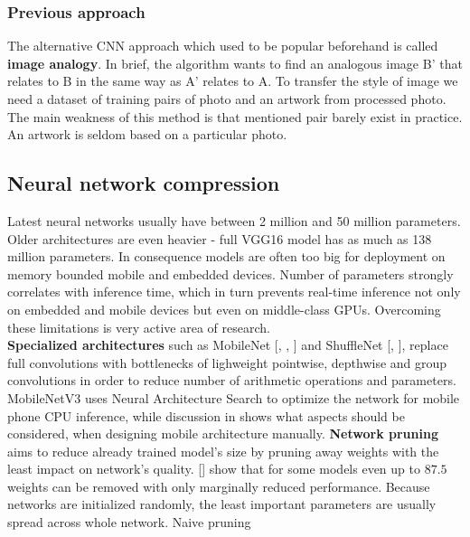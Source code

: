 \documentclass[../Main.tex]{subfiles}
\begin{document}
    \subsubsection{Previous approach}
    The alternative CNN approach which used to be popular beforehand is called \textbf{image analogy}. In brief, the algorithm wants to find an analogous image B' that relates to B in the same way as A' relates to A.  To transfer the style of image we need a dataset of training pairs of photo and an artwork from processed photo. The main weakness of this method is that mentioned pair barely exist in practice. An artwork is seldom based on a particular photo.


\subsection{Neural network compression}
    Latest neural networks usually have between 2 million and 50 million parameters.
    Older architectures are even heavier - full VGG16 model has as much as
    138 million parameters. In consequence models 
    are often too big for deployment on memory bounded mobile and embedded devices.
    Number of parameters strongly correlates with inference time, which in turn
    prevents real-time inference not only on embedded and mobile
    devices but even on middle-class GPUs. Overcoming these limitations 
    is very active area of research.\\
    \textbf{Specialized architectures} such as MobileNet [\cite{mobilenetv1},
    \cite{mobilenetv2}, \cite{mobilenetv3}] and ShuffleNet [\cite{shufflenetv1},
    \cite{shufflenetv2}], replace full convolutions with bottlenecks of lighweight
    pointwise, depthwise and group convolutions in order to reduce number of 
    arithmetic operations and parameters. MobileNetV3 \cite{mobilenetv3} uses
    Neural Architecture Search to optimize the network for mobile phone CPU
    inference, while discussion in \cite{shufflenetv2} shows what aspects should
    be considered, when designing mobile architecture manually. 
    \textbf{Network pruning} aims to reduce already trained model's size by pruning away
    weights with the least impact on network's quality. [\cite{zhu2017prune}] show
    that for some models even up to $87.5$ weights can be removed with only 
    marginally reduced performance. 
    Because networks are initialized randomly, the least
    important parameters are usually spread across whole network. Naive pruning 
\end{document}
